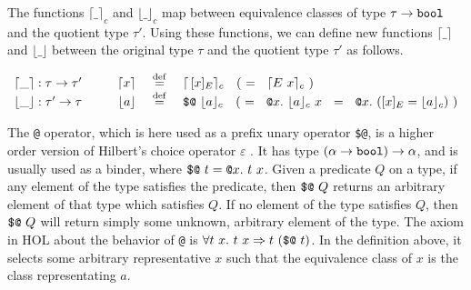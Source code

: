 \documentclass[envcountsame,runningheads]{llncs}
\def\defeq{\stackrel{\mathrm{def}}{=}}
\begin{document}
\vspace{\topsep}
The functions
$\lceil \_ \rceil_c$ and $\lfloor \_ \rfloor_c$
map between equivalence classes of type
$\tau \rightarrow \mbox{\tt bool}$ and the quotient type $\tau'$.
Using these functions, we can define new functions
$\lceil \_ \rceil$ and $\lfloor \_ \rfloor$
between the original
type $\tau$ and the quotient type $\tau'$ as follows.
\begin{definition}
\label{abs_rep_def}
$$
\begin{array}[t]{c@{\hspace{0.1cm}}c@{\hspace{0.1cm}}l@{\hspace{1.0cm}}rcl}
\lceil \_ \rceil & : & \tau \rightarrow \tau' &
\lceil x \rceil  & \ \defeq \ & 
\lceil \, [ x ]_E \rceil_c  \ \ \ ( \ = \ \ 
\lceil E \ x \rceil_c \ )  \\
\lfloor \_ \rfloor & : & \tau' \rightarrow \tau  &
\lfloor  a \rfloor   & \ \defeq \ & 
\mbox{\tt \$@} \ \lfloor a \rfloor_c \ \ \ ( \ = \ \ 
\mbox{\tt @}x.\ \lfloor a \rfloor_c \ x \ \ = \ \ 
\mbox{\tt @}x.\ ( [ x ]_E = \lfloor a \rfloor_c ) \ )
\end{array}
$$
\end{definition}

The {\tt @} operator, which is here used as a prefix unary operator {\tt \$@},
is a higher order version of Hilbert's choice operator $\varepsilon$
\cite{GoMe93}.
It has type $(\alpha \rightarrow \mbox{\tt bool}) \rightarrow \alpha$,
and is usually used as a binder,
where
$\mbox{\tt \$@}\ t = \mbox{\tt @}x.\ t\ x$.
Given a predicate $Q$ on a type,
if any element of the type satisfies the predicate, 
then $\mbox{\tt \$@}\ Q$ returns an arbitrary element of
that type which satisfies $Q$.
If no element of the type satisfies $Q$,
then $\mbox{\tt \$@}\ Q$ will return simply some unknown,
arbitrary element of the type.
The axiom in HOL about the behavior of {\tt @} is
$\forall t\ x.\ t\ x \Rightarrow t\ (\mbox{\tt \$@}\ t)$.
In the definition above, it selects some arbitrary representative $x$ such
that the equivalence class of $x$ is the class representating $a$.

\end{document}
